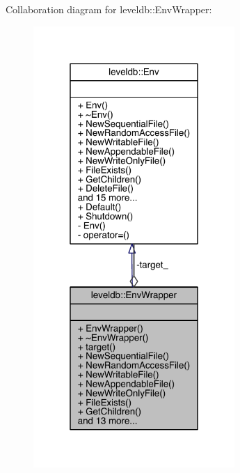 Collaboration diagram for leveldb\+:\+:Env\+Wrapper\+:\nopagebreak
\begin{figure}[H]
\begin{center}
\leavevmode
\includegraphics[width=217pt]{classleveldb_1_1_env_wrapper__coll__graph}
\end{center}
\end{figure}
